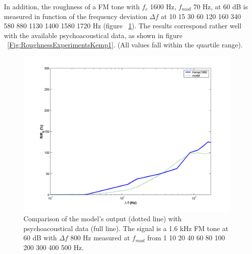 \begin{enumerate}
    In addition, the roughness of a FM tone with $f_c$ 1600 Hz,
    $f_{mod}$ 70 Hz, at 60 dB is measured in function of the frequency
    deviation $\Delta f$ at 10 15 30 60 120 160 340 580 880 1130 1400
    1580 1720 Hz (figure ~\ref{Fig:RoughnessExperimentsKemp2}). The results correspond
    rather well with the available psychoacoustical data, as shown in
    figure ~\ref{Fig:RoughnessExperimentsKemp1}. (All values fall within the quartile
    range).
    \begin{figure}[p]
        \centering
        \includegraphics[width=\IPEMDefaultFigureWidth]{Graphics/RoughnessExperimentsKemp2}
        \caption{Comparison of the model's output (dotted line) with
        psychoacoustical data (full line). The signal is
        a 1.6 kHz FM tone at 60 dB with $\Delta f$ 800 Hz measured
        at $f_{mod}$ from 1 10 20 40 60 80 100 200 300 400 500
        Hz.}
        \label{Fig:RoughnessExperimentsKemp2}
    \end{figure}

\end{enumerate}

